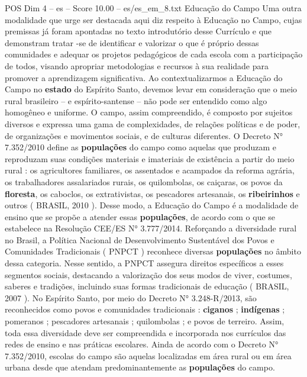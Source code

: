 \begin{textsample}{POS Dim 4 – es – Score 10.00 – es/es\_em\_8.txt}  \label{ex:f4_pos_076}
Educação do Campo Uma outra modalidade que urge ser destacada aqui diz respeito à Educação no Campo, cujas premissas já foram apontadas no texto introdutório desse Currículo e que demonstram tratar -se de identificar e valorizar o que é próprio dessas comunidades e adequar os projetos pedagógicos de cada escola com a participação de todos, visando apropriar metodologias e recursos à sua realidade para promover a aprendizagem significativa.
Ao contextualizarmos a Educação do Campo no \textbf{estado} do Espírito Santo, devemos levar em consideração que o meio rural brasileiro – e espírito-santense – não pode ser entendido como algo homogêneo e uniforme.
O campo, assim compreendido, é composto por sujeitos diversos e expressa uma gama de complexidades, de relações políticas e de poder, de organizações e movimentos sociais, e de culturas diferentes.
O Decreto N{\EmojiFont °} 7.352/2010 define as \textbf{populações} do campo como aquelas que produzam e reproduzam suas condições materiais e imateriais de existência a partir do meio rural : os agricultores familiares, os assentados e acampados da reforma agrária, os trabalhadores assalariados rurais, os quilombolas, os caiçaras, os povos da \textbf{floresta}, os caboclos, os extrativistas, os pescadores artesanais, os \textbf{ribeirinhos} e outros ( BRASIL, 2010 ).
Desse modo, a Educação do Campo é a modalidade de ensino que se propõe a atender essas \textbf{populações}, de acordo com o que se estabelece na Resolução CEE/ES N{\EmojiFont °} 3.777/2014.
Reforçando a diversidade rural no Brasil, a Política Nacional de Desenvolvimento Sustentável dos Povos e Comunidades Tradicionais ( PNPCT ) reconhece diversas \textbf{populações} no âmbito dessa categoria.
Nesse sentido, a PNPCT assegura direitos específicos a esses segmentos sociais, destacando a valorização dos seus modos de viver, costumes, saberes e tradições, incluindo suas formas tradicionais de educação ( BRASIL, 2007 ).
No Espírito Santo, por meio do Decreto N{\EmojiFont °} 3.248-R/2013, são reconhecidos como povos e comunidades tradicionais : \textbf{ciganos} ; \textbf{indígenas} ; pomeranos ; pescadores artesanais ; quilombolas ; e povos de terreiro.
Assim, toda essa diversidade deve ser compreendida e incorporada nos currículos das redes de ensino e nas práticas escolares.
Ainda de acordo com o Decreto N{\EmojiFont °} 7.352/2010, escolas do campo são aquelas localizadas em área rural ou em área urbana desde que atendam predominantemente as \textbf{populações} do campo.

\end{textsample}

